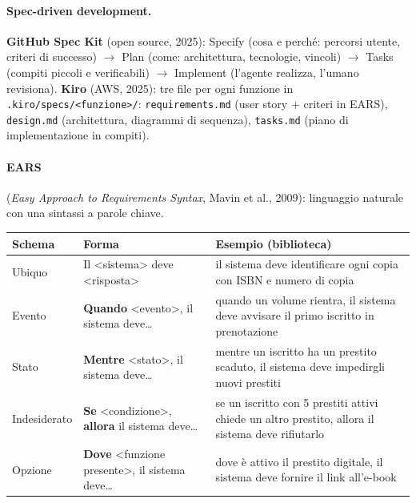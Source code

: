 \documentclass[a4paper,12pt]{article}
\begin{document}
\paragraph{Spec-driven development.} \textbf{GitHub Spec Kit} (open source, 2025): Specify
(cosa e perché: percorsi utente, criteri di successo) $\to$ Plan (come: architettura,
tecnologie, vincoli) $\to$ Tasks (compiti piccoli e verificabili) $\to$ Implement (l'agente
realizza, l'umano revisiona). \textbf{Kiro} (AWS, 2025): tre file per ogni funzione in
\texttt{.kiro/specs/<funzione>/}: \texttt{requirements.md} (user story + criteri in EARS),
\texttt{design.md} (architettura, diagrammi di sequenza), \texttt{tasks.md} (piano di
implementazione in compiti).

\paragraph{EARS} (\emph{Easy Approach to Requirements Syntax}, Mavin et al., 2009):
linguaggio naturale con una sintassi a parole chiave.
\begin{center}
\small
\begin{tabular}{|l|p{4.4cm}|p{8.4cm}|}
\hline
\textbf{Schema} & \textbf{Forma} & \textbf{Esempio (biblioteca)}\\
\hline
Ubiquo & Il \textless sistema\textgreater{} deve \textless risposta\textgreater & il sistema deve
identificare ogni copia con ISBN e numero di copia\\
\hline
Evento & \textbf{Quando} \textless evento\textgreater, il sistema deve\dots & quando un volume
rientra, il sistema deve avvisare il primo iscritto in prenotazione\\
\hline
Stato & \textbf{Mentre} \textless stato\textgreater, il sistema deve\dots & mentre un iscritto
ha un prestito scaduto, il sistema deve impedirgli nuovi prestiti\\
\hline
Indesiderato & \textbf{Se} \textless condizione\textgreater, \textbf{allora} il sistema
deve\dots & se un iscritto con 5 prestiti attivi chiede un altro prestito, allora il sistema
deve rifiutarlo\\
\hline
Opzione & \textbf{Dove} \textless funzione presente\textgreater, il sistema deve\dots & dove è
attivo il prestito digitale, il sistema deve fornire il link all'e-book\\
\hline
\end{tabular}
\end{center}
\end{document}
